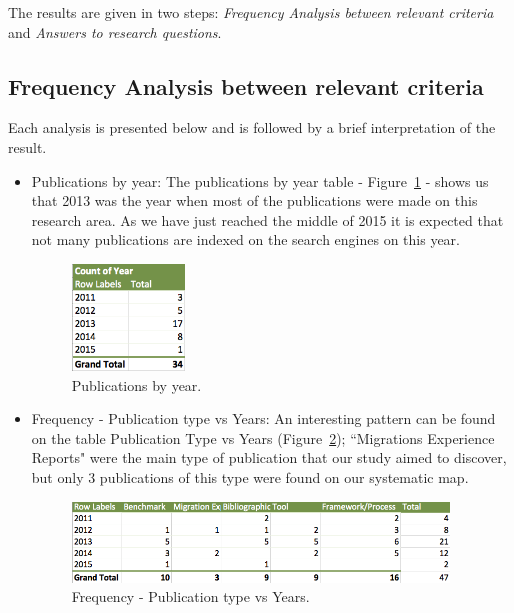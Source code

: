 \documentclass{article}
\begin{document}
The results are given in two steps: \textit{Frequency Analysis between relevant criteria} and \textit{Answers to research questions}. 

\subsection{Frequency Analysis between relevant criteria}
\label{frequencyAnalysis}

Each analysis is presented below and is followed by a brief interpretation of the result. 



\begin{itemize}
\item{Publications by year: }
The publications by year table - Figure~\ref{fig:pubByYear} -  shows us that 2013 was the year when most of the publications were made on this research area. As we have just reached  the middle of 2015 it is expected that not many publications are indexed on the search engines on this year.
\begin{figure}[htb!]
\centering
\includegraphics[width=30mm]{graph2.png}
\caption{Publications by year.\label{fig:pubByYear}}
\end{figure}



\item {Frequency - Publication type vs Years: }
An interesting pattern can be found on the table Publication Type vs Years (Figure~\ref{fig:pubTypeVsYears}); ``Migrations Experience Reports" were the main type of publication that our study aimed to discover, but only 3 publications of this type were found on our systematic map. 

\begin{figure}[htb!]
\centering
\includegraphics[width=100mm]{graph1.png}
\caption{Frequency - Publication type vs Years.\label{fig:pubTypeVsYears}}
\end{figure}



\end{itemize}
\end{document}
